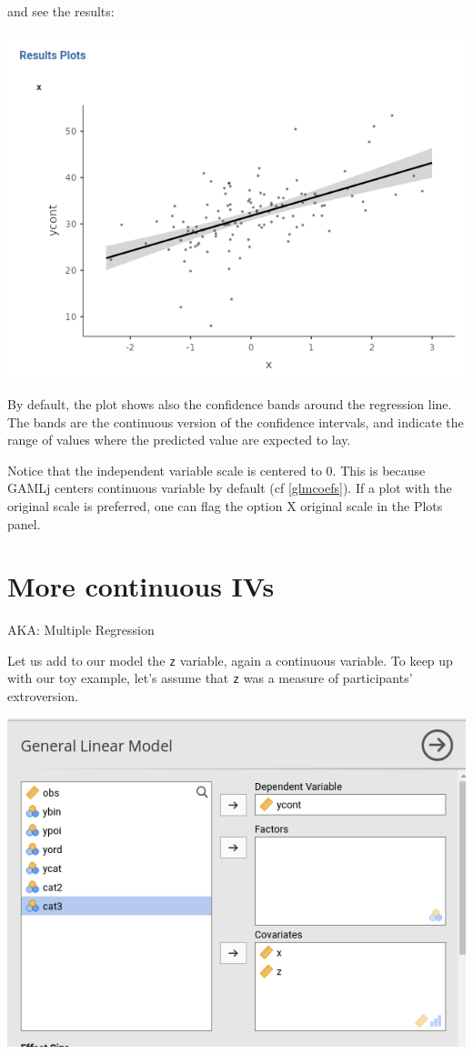 \documentclass[
]{book}
\begin{document}
and see the results:

\includegraphics[width=0.8\linewidth]{bookletpics/2_plot1}

By default, the plot shows also the confidence bands around the regression line. The bands are the continuous version of the confidence intervals, and indicate the range of values where the predicted value are expected to lay.

Notice that the independent variable scale is centered to 0. This is because {GAMLj} centers continuous variable by default (cf \ref{glmcoefs}). If a plot with the original scale is preferred, one can flag the option {X original scale} in the {Plots} panel.

\hypertarget{multiregression}{%
\section{More continuous IVs}\label{multiregression}}

\begin{flushright} AKA: Multiple Regression  \end{flushright}

Let us add to our model the \texttt{z} variable, again a continuous variable. To keep up with our toy example, let's assume that \texttt{z} was a measure of participants' extroversion.

\includegraphics[width=0.7\linewidth]{bookletpics/2_input4}
\end{document}
